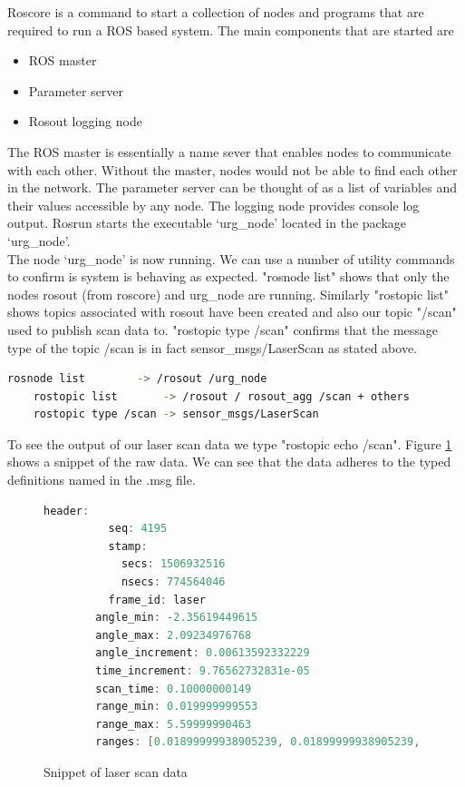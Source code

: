 \documentclass[capstone_report.tex]{subfiles}
\begin{document}
Roscore is a command to start a collection of nodes and programs that are required to run a ROS based system.  The main components that are started are 
\begin{itemize}
    \item ROS master
    \item Parameter server
    \item Rosout logging node
\end{itemize}

The ROS master is essentially a name sever that enables nodes to communicate with each other.  Without the master, nodes would not be able to find each other in the network.  The parameter server can be thought of as a list of variables and their values accessible by any node.  The logging node provides console log output.  Rosrun starts the executable ‘urg\_node’ located in the package ‘urg\_node’.\\

The node ‘urg\_node’ is now running.  We can use a number of utility commands to confirm is system is behaving as expected.  "rosnode list" shows that only the nodes \/rosout (from roscore) and \/urg\_node are running.  Similarly "rostopic list" shows topics associated with rosout have been created and also our topic "/scan" used to publish scan data to.  "rostopic type /scan" confirms that the message type of the topic /scan is in fact sensor\_msgs/LaserScan as stated above.

\begin{lstlisting}[language=bash]
    rosnode list        -> /rosout /urg_node
    rostopic list       -> /rosout / rosout_agg /scan + others
    rostopic type /scan -> sensor_msgs/LaserScan 
\end{lstlisting}

To see the output of our laser scan data we type "rostopic echo /scan".  Figure \ref{fig:laser_snippet} shows a snippet of the raw data.  We can see that the data adheres to the typed definitions named in the .msg file.

\begin{figure}[H]
    \centering
\begin{lstlisting}[language=c++]
        header: 
          seq: 4195
          stamp: 
            secs: 1506932516
            nsecs: 774564046
          frame_id: laser
        angle_min: -2.35619449615
        angle_max: 2.09234976768
        angle_increment: 0.00613592332229
        time_increment: 9.76562732831e-05
        scan_time: 0.10000000149
        range_min: 0.019999999553
        range_max: 5.59999990463
        ranges: [0.01899999938905239, 0.01899999938905239, ...
    \end{lstlisting}
    \caption{Snippet of laser scan data}
    \label{fig:laser_snippet}
\end{figure}
\end{document}
